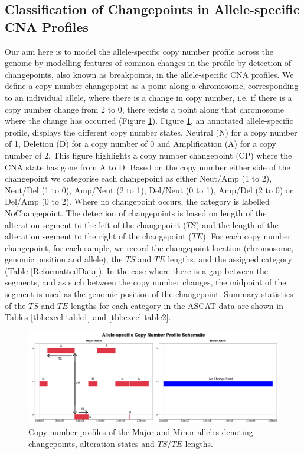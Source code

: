 \subsection{Classification of Changepoints in Allele-specific CNA Profiles}
Our aim here is to model the allele-specific copy number profile across the genome by modelling features of common changes in the profile by detection of changepoints, also known as breakpoints, in the allele-specific CNA profiles. We define a copy number changepoint as a point along a chromosome, corresponding to an individual allele, where there is a change in copy number, i.e. if there is a copy number change from 2 to 0, there exists a point along that chromosome where the change has occurred (Figure \ref{fig:MockASCAT_1}). Figure \ref{fig:MockASCAT_1}, an annotated allele-specific profile, displays the different copy number states, Neutral (N) for a copy number of 1, Deletion (D) for a copy number of 0 and Amplification (A) for a copy number of 2. This figure highlights a copy number changepoint (CP) where the CNA state has gone from A to D. Based on the copy number either side of the changepoint we categorise each changepoint as either Neut/Amp (1 to 2), Neut/Del (1 to 0), Amp/Neut (2 to 1), Del/Neut (0 to 1), Amp/Del (2 to 0) or Del/Amp (0 to 2). Where no changepoint occurs, the category is labelled NoChangepoint. The detection of changepoints is based on length of the alteration segment to the left of the changepoint ($TS$) and the length of the alteration segment to the right of the changepoint ($TE$). For each copy number changepoint, for each sample, we record the changepoint location (chromosome, genomic position and allele), the $TS$ and $TE$ lengths, and the assigned category (Table \ref{ReformattedData}). In the case where there is a gap between the segments, and as such between the copy number changes, the midpoint of the segment is used as the genomic position of the changepoint. Summary statistics of the $TS$ and $TE$ lengths for each category in the ASCAT data are shown in Tables \ref{tbl:excel-table1} and \ref{tbl:excel-table2}. 

\begin{figure}[!ht]
\center
\includegraphics[width = 1\textwidth]{../figures/Chapter_5/Annotated_ASCAT_Profile.png}
\caption[Copy number profiles of the Major and Minor alleles denoting changepoints, alteration states and $TS$/$TE$ lengths.]{Copy number profiles of the Major and Minor alleles denoting changepoints, alteration states and $TS$/$TE$ lengths.}
\label{fig:MockASCAT_1}
\end{figure}

